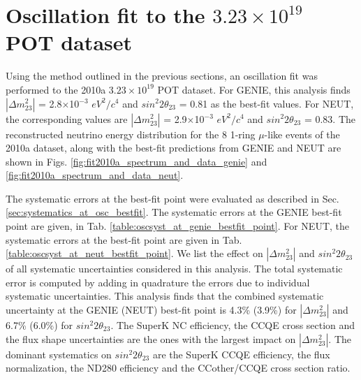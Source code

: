 \section {Oscillation fit to the $3.23\times10^{19}$ POT dataset}
\label{sec:oscfit_runI}

Using the method outlined in the previous sections,
an oscillation fit was performed to the 2010a $3.23\times10^{19}$ POT dataset.
For GENIE, this analysis finds
$|\Delta m^{2}_{23}|$ = 2.8$\times$10$^{-3}$ $eV^{2}/c^{4}$ and
$sin^{2}2\theta_{23}$ = 0.81
as the best-fit values.
For NEUT, the corresponding values are
$|\Delta m^{2}_{23}|$ = 2.9$\times$10$^{-3}$ $eV^{2}/c^{4}$ and
$sin^{2}2\theta_{23}$ = 0.83.
The reconstructed neutrino energy distribution for the 8 1-ring $\mu$-like events of the 
2010a dataset, along with the best-fit predictions from GENIE and NEUT are shown in  
Figs. \ref{fig:fit2010a_spectrum_and_data_genie} and \ref{fig:fit2010a_spectrum_and_data_neut}.

The systematic errors at the best-fit point were evaluated as described in 
Sec. \ref{sec:systematics_at_osc_bestfit}.
The systematic errors at the GENIE best-fit point are given, 
in Tab. \ref{table:oscsyst_at_genie_bestfit_point}. 
For NEUT, the systematic errors at the best-fit point
are given in Tab. \ref{table:oscsyst_at_neut_bestfit_point}.
We list the effect on $|\Delta m^{2}_{23}|$ and $sin^{2}2\theta_{23}$ of
all systematic uncertainties considered in this analysis.
The total systematic error is computed by adding 
in quadrature
the errors due to individual systematic uncertainties.
This analysis finds that the combined systematic uncertainty at the GENIE (NEUT) best-fit point 
is 4.3\% (3.9\%) for $|\Delta m^{2}_{23}|$ and 6.7\% (6.0\%) for $sin^{2}2\theta_{23}$.
The SuperK NC efficiency, the CCQE cross section and the flux shape uncertainties 
are the ones with the largest impact on $|\Delta m^{2}_{23}|$.
The dominant systematics on $sin^{2}2\theta_{23}$ are the SuperK CCQE efficiency,
the flux normalization, the ND280 efficiency and the CCother/CCQE cross section ratio.

